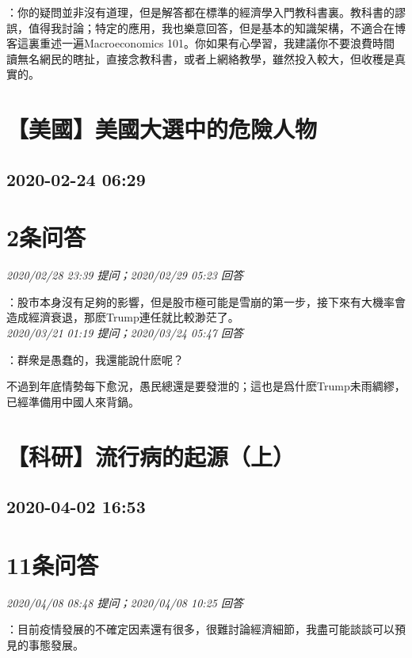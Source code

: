 \documentclass[twocolumn]{ctexart}
\begin{document}
：你的疑問並非沒有道理，但是解答都在標準的經濟學入門教科書裏。教科書的謬誤，值得我討論；特定的應用，我也樂意回答，但是基本的知識架構，不適合在博客這裏重述一遍Macroeconomics 101。你如果有心學習，我建議你不要浪費時間讀無名網民的瞎扯，直接念教科書，或者上網絡教學，雖然投入較大，但收穫是真實的。
\\


\section{【美國】美國大選中的危險人物}
\subsection{2020-02-24 06:29}


\section{2条问答}

\textit{\hfill\noindent\small 2020/02/28 23:39 提问；2020/02/29 05:23 回答}

：股市本身沒有足夠的影響，但是股市極可能是雪崩的第一步，接下來有大機率會造成經濟衰退，那麽Trump連任就比較渺茫了。
\\

\textit{\hfill\noindent\small 2020/03/21 01:19 提问；2020/03/24 05:47 回答}

：群衆是愚蠢的，我還能說什麽呢？

不過到年底情勢每下愈況，愚民總還是要發泄的；這也是爲什麽Trump未雨綢繆，已經準備用中國人來背鍋。
\\


\section{【科研】流行病的起源（上）}
\subsection{2020-04-02 16:53}


\section{11条问答}

\textit{\hfill\noindent\small 2020/04/08 08:48 提问；2020/04/08 10:25 回答}

：目前疫情發展的不確定因素還有很多，很難討論經濟細節，我盡可能談談可以預見的事態發展。
\end{document}
